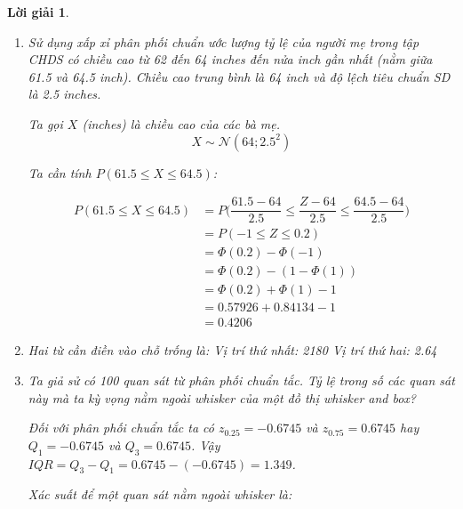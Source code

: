 \documentclass[14pt, a4paper]{article}
\theoremstyle{sltheorem}
\theoremstyle{soltheorem}
\newtheorem*{loigiai}{Lời giải}
\begin{document}
\begin{loigiai}
\begin{enumerate}[wide, labelwidth=!, labelindent=0pt,label=\textbf{\arabic*}.]
        \item Sử dụng xấp xỉ phân phối chuẩn ước lượng tỷ lệ của người mẹ trong tập CHDS có chiều cao từ 62 đến 64 inches đến nửa inch gần nhất (nằm giữa 61.5 và 64.5 inch).
        Chiều cao trung bình là 64 inch và độ lệch tiêu chuẩn SD là 2.5 inches.

        Ta gọi $X$ (inches) là chiều cao của các bà mẹ.
        \begin{equation*}
            X \sim \mathcal{N} (64; 2.5^2)
        \end{equation*}

        Ta cần tính $P(61.5 \leq X \leq 64.5)$:

        \begin{equation*}
            \begin{aligned}
                P (61.5 \leq X \leq 64.5) &= P \Big( \dfrac{61.5 - 64}{2.5} \leq \dfrac{Z - 64}{2.5} \leq \dfrac{64.5 - 64}{2.5} \Big) \\
                &= P (-1 \leq Z \leq 0.2) \\
                &= \Phi (0.2) - \Phi (-1) \\
                &= \Phi (0.2) - (1 - \Phi(1)) \\
                &= \Phi(0.2) + \Phi(1) - 1 \\
                &= 0.57926 + 0.84134 - 1 \\
                &= 0.4206
            \end{aligned}
        \end{equation*}

        \item Hai từ cần điền vào chỗ trống là:
        Vị trí thứ nhất: 2180
        Vị trí thứ hai: 2.64

        \item Ta giả sử có 100 quan sát từ phân phối chuẩn tắc.
        Tỷ lệ trong số các quan sát này mà ta kỳ vọng nằm ngoài whisker của một đồ thị whisker and box?


        Đối với phân phối chuẩn tắc ta có $z_{0.25}=-0.6745$ và $z_{0.75}=0.6745$ hay $Q_1=-0.6745$ và $Q_3=0.6745$.
        Vậy $IQR=Q_3 - Q_1 = 0.6745 - (-0.6745)=1.349$.

        Xác suất để một quan sát nằm ngoài whisker là:


\end{enumerate}
\end{loigiai}
\end{document}
